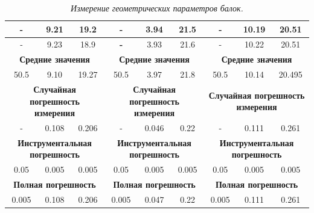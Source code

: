 \documentclass[a4paper,12pt]{report}
\begin{document}
\begin{table}[h!]
{\begin{tabular}{|c|c|c|c|c|c|c|c|c|}
-                    & 9.21                & 19.2                & -                    & 3.94                & 21.5                & -                    & 10.19               & 20.51               \\ \hline
-                    & 9.23                & 18.9                & \textbf{-}           & 3.93                & 21.6                & -                    & 10.22               & 20.51               \\ \hline
\multicolumn{3}{|c|}{\textbf{Средние значения}}                  & \multicolumn{3}{c|}{\textbf{Средние значения}}                   & \multicolumn{3}{c|}{\textbf{Средние значения}}                   \\ \hline
50.5                 & 9.10                & 19.27               & 50.5                 & 3.97                & 21.8                & 50.5                 & 10.14               & 20.495              \\ \hline
\multicolumn{3}{|c|}{\textbf{Случайная   погрешность измерения}} & \multicolumn{3}{c|}{\textbf{Случайная   погрешность измерения}}  & \multicolumn{3}{c|}{\textbf{Случайная   погрешность измерения}}  \\ \hline
-                    & 0.108               & 0.206               & -                    & 0.046               & 0.22                & -                    & 0.111               & 0.261               \\ \hline
\multicolumn{3}{|c|}{\textbf{Инструментальная   погрешность}}    & \multicolumn{3}{c|}{\textbf{Инструментальная   погрешность}}     & \multicolumn{3}{c|}{\textbf{Инструментальная   погрешность}}     \\ \hline
0.05                 & 0.005               & 0.005               & 0.05                 & 0.005               & 0.005               & 0.05                 & 0.005               & 0.005               \\ \hline
\multicolumn{3}{|c|}{\textbf{Полная погрешность}}                & \multicolumn{3}{c|}{\textbf{Полная погрешность}}                 & \multicolumn{3}{c|}{\textbf{Полная погрешность}}                 \\ \hline
0.005                & 0.108               & 0.206               & 0.005                & 0.047               & 0.22                & 0.005                & 0.111               & 0.261               \\ \hline
\end{tabular}
}
\caption{\textit{Измерение геометрических параметров балок.}}
\end{table}
\end{document}

